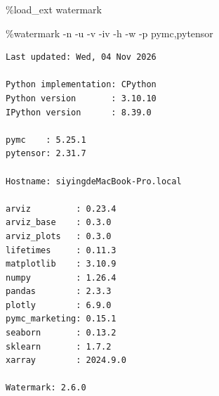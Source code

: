 \documentclass[
]{ctexart}
\newenvironment{Shaded}{\begin{snugshade}}{\end{snugshade}}
\newcommand{\NormalTok}[1]{\textcolor[rgb]{0.00,0.23,0.31}{#1}}
\newcommand{\OperatorTok}[1]{\textcolor[rgb]{0.37,0.37,0.37}{#1}}
\begin{document}
\begin{Shaded}
\begin{Highlighting}[]
\OperatorTok{\%}\NormalTok{load\_ext watermark}
\end{Highlighting}
\end{Shaded}

\begin{Shaded}
\begin{Highlighting}[]

\OperatorTok{\%}\NormalTok{watermark }\OperatorTok{{-}}\NormalTok{n }\OperatorTok{{-}}\NormalTok{u }\OperatorTok{{-}}\NormalTok{v }\OperatorTok{{-}}\NormalTok{iv }\OperatorTok{{-}}\NormalTok{h }\OperatorTok{{-}}\NormalTok{w }\OperatorTok{{-}}\NormalTok{p pymc,pytensor}
\end{Highlighting}
\end{Shaded}

\begin{verbatim}
Last updated: Wed, 04 Nov 2026

Python implementation: CPython
Python version       : 3.10.10
IPython version      : 8.39.0

pymc    : 5.25.1
pytensor: 2.31.7

Hostname: siyingdeMacBook-Pro.local

arviz         : 0.23.4
arviz_base    : 0.3.0
arviz_plots   : 0.3.0
lifetimes     : 0.11.3
matplotlib    : 3.10.9
numpy         : 1.26.4
pandas        : 2.3.3
plotly        : 6.9.0
pymc_marketing: 0.15.1
seaborn       : 0.13.2
sklearn       : 1.7.2
xarray        : 2024.9.0

Watermark: 2.6.0
\end{verbatim}
\end{document}
